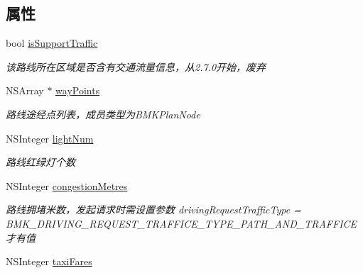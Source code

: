 \subsection*{属性}
\begin{DoxyCompactItemize}
\item 
\hypertarget{interface_b_m_k_driving_route_line_a23c30bf764fd27531e7f7d1e1cb1d6b4}{}bool \hyperlink{interface_b_m_k_driving_route_line_a23c30bf764fd27531e7f7d1e1cb1d6b4}{is\+Support\+Traffic}\label{interface_b_m_k_driving_route_line_a23c30bf764fd27531e7f7d1e1cb1d6b4}

\begin{DoxyCompactList}\small\item\em 该路线所在区域是否含有交通流量信息，从2.7.\+0开始，废弃 \end{DoxyCompactList}\item 
\hypertarget{interface_b_m_k_driving_route_line_a577c5a10368ef9c18ac73f20836092bd}{}N\+S\+Array $\ast$ \hyperlink{interface_b_m_k_driving_route_line_a577c5a10368ef9c18ac73f20836092bd}{way\+Points}\label{interface_b_m_k_driving_route_line_a577c5a10368ef9c18ac73f20836092bd}

\begin{DoxyCompactList}\small\item\em 路线途经点列表，成员类型为\+B\+M\+K\+Plan\+Node \end{DoxyCompactList}\item 
\hypertarget{interface_b_m_k_driving_route_line_add3683722075ec45112579d495dfd9d3}{}N\+S\+Integer \hyperlink{interface_b_m_k_driving_route_line_add3683722075ec45112579d495dfd9d3}{light\+Num}\label{interface_b_m_k_driving_route_line_add3683722075ec45112579d495dfd9d3}

\begin{DoxyCompactList}\small\item\em 路线红绿灯个数 \end{DoxyCompactList}\item 
\hypertarget{interface_b_m_k_driving_route_line_af3c2278d3e8c321b7db9116a04449fdc}{}N\+S\+Integer \hyperlink{interface_b_m_k_driving_route_line_af3c2278d3e8c321b7db9116a04449fdc}{congestion\+Metres}\label{interface_b_m_k_driving_route_line_af3c2278d3e8c321b7db9116a04449fdc}

\begin{DoxyCompactList}\small\item\em 路线拥堵米数，发起请求时需设置参数 driving\+Request\+Traffic\+Type = B\+M\+K\+\_\+\+D\+R\+I\+V\+I\+N\+G\+\_\+\+R\+E\+Q\+U\+E\+S\+T\+\_\+\+T\+R\+A\+F\+F\+I\+C\+E\+\_\+\+T\+Y\+P\+E\+\_\+\+P\+A\+T\+H\+\_\+\+A\+N\+D\+\_\+\+T\+R\+A\+F\+F\+I\+C\+E 才有值 \end{DoxyCompactList}\item 
\hypertarget{interface_b_m_k_driving_route_line_ac5eb8eb15519351fba1f401ab95e480b}{}N\+S\+Integer \hyperlink{interface_b_m_k_driving_route_line_ac5eb8eb15519351fba1f401ab95e480b}{taxi\+Fares}\label{interface_b_m_k_driving_route_line_ac5eb8eb15519351fba1f401ab95e480b}


\end{DoxyCompactItemize}
